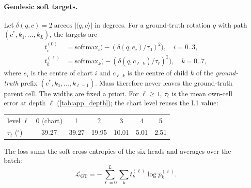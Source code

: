 \paragraph{Geodesic soft targets.}\label{app:softtargets}
Let $\delta(q,c)=2\arccos|\langle q,c\rangle|$ in degrees. For a ground-truth rotation $q$ with path $(c^*,k_1,\dots,k_L)$, the targets are
\begin{align}
  t^{(0)}_i&=\mathrm{softmax}_i\big(-(\delta(q,e_i)/\tau_0)^2\big),\quad i=0..3,\\
  t^{(\ell)}_k&=\mathrm{softmax}_k\big(-(\delta(q,c_{\ell,k})/\tau_\ell)^2\big),\quad k=0..7,
\end{align}
where $e_i$ is the centre of chart $i$ and $c_{\ell,k}$ is the centre of child $k$ of the \emph{ground-truth} prefix $(c^*,k_1,\dots,k_{\ell-1})$. Mass therefore never leaves the ground-truth parent cell. The widths are fixed a priori. For $\ell\ge1$, $\tau_\ell$ is the mean own-cell error at depth $\ell$ (\cref{tab:app_depth}); the chart level reuses the L1 value:
\begin{center}\footnotesize
\begin{tabular}{@{}lcccccc@{}}
  \toprule
  level $\ell$ & 0 (chart) & 1 & 2 & 3 & 4 & 5\\
  $\tau_\ell$ ($^\circ$) & 39.27 & 39.27 & 19.95 & 10.01 & 5.01 & 2.51\\
  \bottomrule
\end{tabular}
\end{center}
The loss sums the soft cross-entropies of the six heads and averages over the batch:
\begin{equation}
  \mathcal{L}_{\text{GT}}=-\sum_{\ell=0}^{L}\sum_{k}t^{(\ell)}_k\log p^{(\ell)}_k .
\end{equation}

